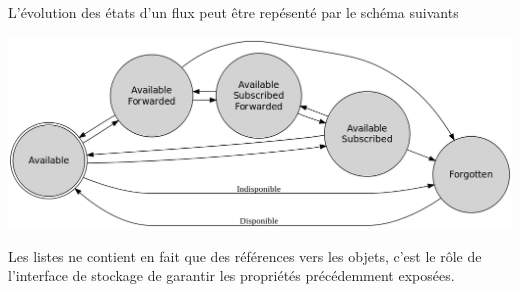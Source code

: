 L'évolution des états d'un flux peut être repésenté par le schéma suivants

\begin{center}
    \includegraphics[width=1\textwidth]{img/state.png}
\end{center}

Les listes ne contient en fait que des références vers les objets, c'est le rôle de l'interface de
stockage de garantir les propriétés précédemment exposées. \\

